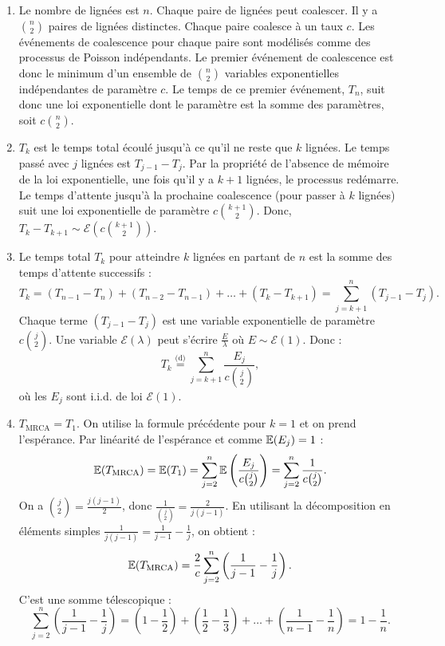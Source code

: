 \documentclass[]{exercices}
\begin{document}
\begin{solution}
\begin{enumerate}
    \item Le nombre de lignées est $n$. Chaque paire de lignées peut coalescer. Il y a $\binom{n}{2}$ paires de lignées distinctes. Chaque paire coalesce à un taux $c$. Les événements de coalescence pour chaque paire sont modélisés comme des processus de Poisson indépendants. Le premier événement de coalescence est donc le minimum d'un ensemble de $\binom{n}{2}$ variables exponentielles indépendantes de paramètre $c$. Le temps de ce premier événement, $T_n$, suit donc une loi exponentielle dont le paramètre est la somme des paramètres, soit $c\binom{n}{2}$.
    \item $T_k$ est le temps total écoulé jusqu'à ce qu'il ne reste que $k$ lignées. Le temps passé avec $j$ lignées est $T_{j-1}-T_j$. Par la propriété de l'absence de mémoire de la loi exponentielle, une fois qu'il y a $k+1$ lignées, le processus redémarre. Le temps d'attente jusqu'à la prochaine coalescence (pour passer à $k$ lignées) suit une loi exponentielle de paramètre $c\binom{k+1}{2}$. Donc, $T_k - T_{k+1} \sim \mathcal{E}(c\binom{k+1}{2})$.
    \item Le temps total $T_k$ pour atteindre $k$ lignées en partant de $n$ est la somme des temps d'attente successifs :
    \[ T_k = (T_{n-1} - T_n) + (T_{n-2} - T_{n-1}) + \dots + (T_k - T_{k+1}) = \sum_{j=k+1}^n (T_{j-1} - T_j). \]
    Chaque terme $(T_{j-1} - T_j)$ est une variable exponentielle de paramètre $c\binom{j}{2}$. Une variable $\mathcal{E}(\lambda)$ peut s'écrire $\frac{E}{\lambda}$ où $E \sim \mathcal{E}(1)$. Donc :
    \[ T_k \overset{\text{(d)}}{=} \sum_{j=k+1}^{n} \frac{E_j}{c \binom{j}{2}}, \]
    où les $E_j$ sont i.i.d. de loi $\mathcal{E}(1)$.
    \item $T_\mathrm{MRCA} = T_1$. On utilise la formule précédente pour $k=1$ et on prend l'espérance. Par linéarité de l'espérance et comme $\mathbb{E}(E_j)=1$ :
    \[ \mathbb{E}(T_\mathrm{MRCA}) = \mathbb{E}(T_1) = \sum_{j=2}^{n} \mathbb{E}\left(\frac{E_j}{c \binom{j}{2}}\right) = \sum_{j=2}^{n} \frac{1}{c \binom{j}{2}}. \]
    On a $\binom{j}{2} = \frac{j(j-1)}{2}$, donc $\frac{1}{\binom{j}{2}} = \frac{2}{j(j-1)}$. En utilisant la décomposition en éléments simples $\frac{1}{j(j-1)} = \frac{1}{j-1} - \frac{1}{j}$, on obtient :
    \[ \mathbb{E}(T_\mathrm{MRCA}) = \frac{2}{c} \sum_{j=2}^{n} \left(\frac{1}{j-1} - \frac{1}{j}\right). \]
    C'est une somme télescopique :
    \[ \sum_{j=2}^{n} \left(\frac{1}{j-1} - \frac{1}{j}\right) = \left(1 - \frac{1}{2}\right) + \left(\frac{1}{2} - \frac{1}{3}\right) + \dots + \left(\frac{1}{n-1} - \frac{1}{n}\right) = 1 - \frac{1}{n}. \]

\end{enumerate}
\end{solution}
\end{document}

